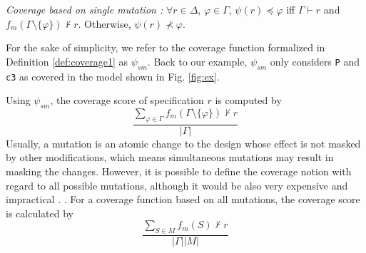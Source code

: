 \begin{definition} {\emph{Coverage based on single mutation \cite{chockler2010coverage, chockler_coverage_2003}:}}
  \label{def:coverage1}
   $\forall r \in \Delta$,
   $\varphi \in \Gamma$,
   $\psi (r) \preccurlyeq \varphi$
   iff $\Gamma \vdash r$ and
   $f_m (\Gamma \setminus \{ \varphi \}) \nvdash r$. Otherwise, $\psi (r) \nprec \varphi$.
\end{definition}

For the sake of simplicity, we refer to the coverage function
formalized in Definition \ref{def:coverage1} as $\psi_{sm}$.
Back to our example, $\psi_{sm}$ only considers {\tt P} and {\tt c3} as covered in the model shown in Fig. \ref{fig:ex}.

Using $\psi_{sm}$, the coverage score of specification $r$ is computed by $$\frac{\sum_{\varphi \in \Gamma} f_m (\Gamma \setminus \{ \varphi \}) \nvdash r}{|\Gamma|}$$
Usually, a mutation is an atomic change to the design whose effect is not masked by other modifications, which means simultaneous mutations may result in masking the changes. However,
it is possible to define the coverage notion with regard to all possible mutations, although it would be also very expensive and impractical \cite{chockler2001practical}. .
For a coverage function based on all mutations, the coverage score is calculated by
$$ \frac{\sum_{S \in M} f_m (S) \nvdash r}{|\Gamma| |M|}$$
\fi
\fi



